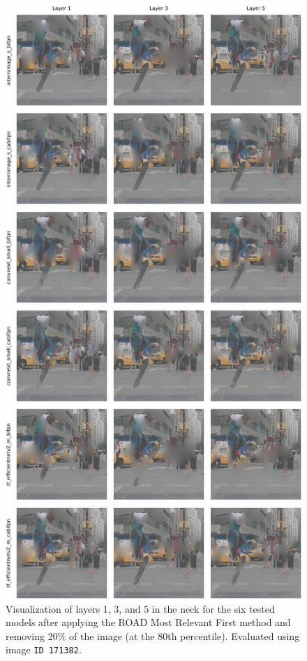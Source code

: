 \begin{figure}[H]
    \centering
    \includegraphics[width=\textwidth,height=0.9\textheight,keepaspectratio]{figures/road/ROADMostRelevantFirst_80_all_models.jpeg}
    \caption{Visualization of layers 1, 3, and 5 in the neck for the six tested models after applying the ROAD Most Relevant First method and removing $20\%$ of the image (at the 80th percentile). Evaluated using image \texttt{ID 171382}.}
    \label{fig:results:road:mrf}
\end{figure}